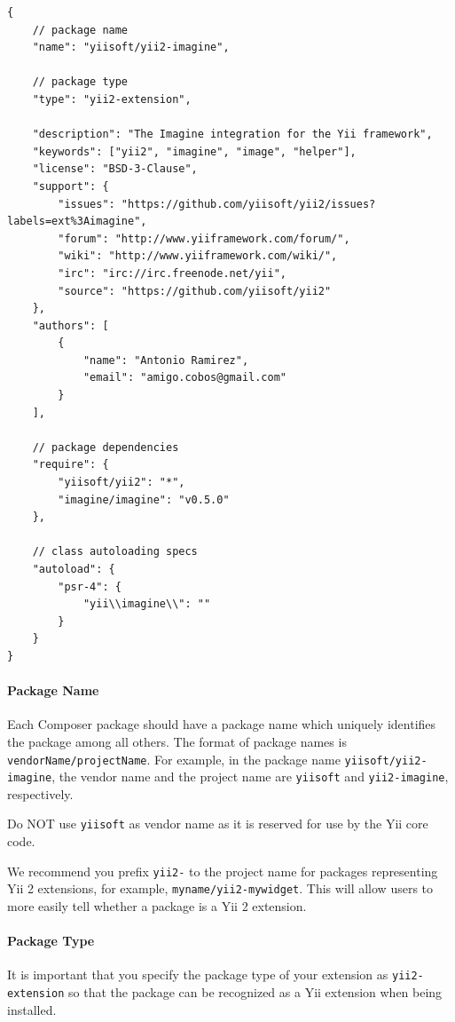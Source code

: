 \lstset{language=json}\begin{lstlisting}
{
    // package name
    "name": "yiisoft/yii2-imagine",

    // package type
    "type": "yii2-extension",

    "description": "The Imagine integration for the Yii framework",
    "keywords": ["yii2", "imagine", "image", "helper"],
    "license": "BSD-3-Clause",
    "support": {
        "issues": "https://github.com/yiisoft/yii2/issues?labels=ext%3Aimagine",
        "forum": "http://www.yiiframework.com/forum/",
        "wiki": "http://www.yiiframework.com/wiki/",
        "irc": "irc://irc.freenode.net/yii",
        "source": "https://github.com/yiisoft/yii2"
    },
    "authors": [
        {
            "name": "Antonio Ramirez",
            "email": "amigo.cobos@gmail.com"
        }
    ],

    // package dependencies
    "require": {
        "yiisoft/yii2": "*",
        "imagine/imagine": "v0.5.0"
    },

    // class autoloading specs
    "autoload": {
        "psr-4": {
            "yii\\imagine\\": ""
        }
    }
}
\end{lstlisting}
\paragraph{Package Name \label{structure-extensions.md::package-name}}
Each Composer package should have a package name which uniquely identifies the package among all others.
The format of package names is \lstinline|vendorName/projectName|. For example, in the package name \lstinline|yiisoft/yii2-imagine|,
the vendor name and the project name are \lstinline|yiisoft| and \lstinline|yii2-imagine|, respectively.

Do NOT use \lstinline|yiisoft| as vendor name as it is reserved for use by the Yii core code.

We recommend you prefix \lstinline|yii2-| to the project name for packages representing Yii 2 extensions, for example,
\lstinline|myname/yii2-mywidget|. This will allow users to more easily tell whether a package is a Yii 2 extension.

\paragraph{Package Type \label{structure-extensions.md::package-type}}
It is important that you specify the package type of your extension as \lstinline|yii2-extension| so that the package can
be recognized as a Yii extension when being installed.

